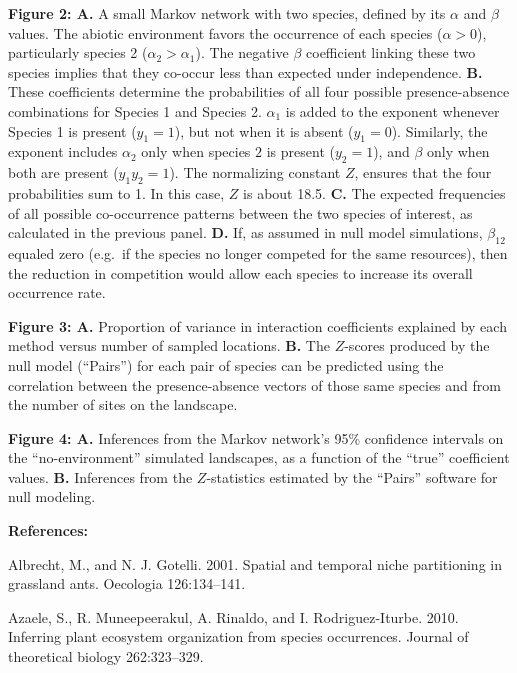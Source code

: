 \documentclass[12pt,]{article}
\begin{document}
\begin{spacing}{1.9}
\begin{flushleft}
\noindent \textbf{Figure 2: A.} A small Markov network with two species,
defined by its \(\alpha\) and \(\beta\) values. The abiotic environment
favors the occurrence of each species (\(\alpha >0\)), particularly
species 2 (\(\alpha_2 > \alpha_1\)). The negative \(\beta\) coefficient
linking these two species implies that they co-occur less than expected
under independence. \textbf{B.} These coefficients determine the
probabilities of all four possible presence-absence combinations for
Species 1 and Species 2. \(\alpha_1\) is added to the exponent whenever
Species 1 is present (\(y_1 = 1\)), but not when it is absent
(\(y_1 = 0\)). Similarly, the exponent includes \(\alpha_2\) only when
species \(2\) is present (\(y_2 = 1\)), and \(\beta\) only when both are
present (\(y_1y_2 = 1\)). The normalizing constant \(Z\), ensures that
the four probabilities sum to 1. In this case, \(Z\) is about 18.5.
\textbf{C.} The expected frequencies of all possible co-occurrence
patterns between the two species of interest, as calculated in the
previous panel. \textbf{D.} If, as assumed in null model simulations,
\(\beta_{12}\) equaled zero (e.g.~if the species no longer competed for
the same resources), then the reduction in competition would allow each
species to increase its overall occurrence rate.

\noindent \textbf{Figure 3: A.} Proportion of variance in interaction
coefficients explained by each method versus number of sampled
locations. \textbf{B.} The \(Z\)-scores produced by the null model
(``Pairs'') for each pair of species can be predicted using the
correlation between the presence-absence vectors of those same species
and from the number of sites on the landscape.

\noindent \textbf{Figure 4: A.} Inferences from the Markov network's
95\% confidence intervals on the ``no-environment'' simulated
landscapes, as a function of the ``true'' coefficient values.
\textbf{B.} Inferences from the \(Z\)-statistics estimated by the
``Pairs'' software for null modeling.

\textbf{References:}

\setlength{\parindent}{-1em} \setlength{\leftskip}{1em}

Albrecht, M., and N. J. Gotelli. 2001. Spatial and temporal niche
partitioning in grassland ants. Oecologia 126:134--141.

Azaele, S., R. Muneepeerakul, A. Rinaldo, and I. Rodriguez-Iturbe. 2010.
Inferring plant ecosystem organization from species occurrences. Journal
of theoretical biology 262:323--329.


\end{flushleft}
\end{spacing}
\end{document}
